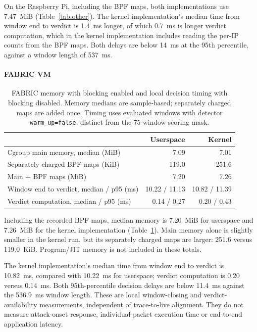 On the Raspberry Pi, including the BPF maps, both implementations use 7.47~MiB
(Table~\ref{tab:other}). The kernel implementation's median time from window
end to verdict is 1.4~ms longer, of which 0.7~ms is longer verdict
computation, which in the kernel implementation includes reading the
per-IP counts from the BPF maps. Both delays are below
14~ms at the 95th percentile, against a window length of 537~ms.

\paragraph{FABRIC VM}

\begin{table}[H]
  \centering
  \small
  \begin{tabular}{@{}lrr@{}}
    \toprule
    & Userspace & Kernel \\
    \midrule
    Cgroup main memory, median (MiB) & 7.09 & 7.01 \\
    Separately charged BPF maps (KiB) & 119.0 & 251.6 \\
    Main + BPF maps (MiB) & 7.20 & 7.26 \\
    Window end to verdict, median / p95 (ms) & 10.22 / 11.13 & 10.82 / 11.39 \\
    Verdict computation, median / p95 (ms) & 0.14 / 0.27 & 0.20 / 0.43 \\
    \bottomrule
  \end{tabular}
  \caption{FABRIC memory with blocking enabled and local decision timing with blocking disabled. Memory medians are sample-based; separately charged maps are added once. Timing uses evaluated windows with detector \texttt{warm\_up=false}, distinct from the 75-window scoring mask.}
  \label{tab:fabric-other}
\end{table}

Including the recorded BPF maps, median memory is 7.20~MiB for userspace and
7.26~MiB for the kernel implementation (Table~\ref{tab:fabric-other}). Main
memory alone is slightly smaller in the kernel run, but its separately
charged maps are larger: 251.6 versus 119.0~KiB. Program/JIT memory is not
included in these totals.

The kernel implementation's median time from window end to verdict is
10.82~ms, compared with 10.22~ms for userspace; verdict computation is
0.20 versus 0.14~ms. Both 95th-percentile decision delays are below 11.4~ms
against the 536.9~ms window length. These are local window-closing and
verdict-availability measurements, independent of trace-to-live alignment.
They do not measure attack-onset response, individual-packet execution time
or end-to-end application latency.


